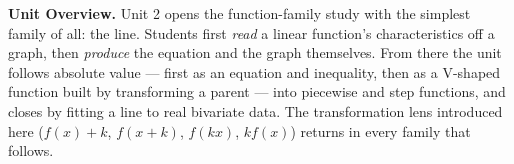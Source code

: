 \documentclass[10pt]{article}
\begin{document}

\vspace*{1.38in}

\begin{tcolorbox}[colback=forestbg,colframe=forest,boxrule=0.9pt,arc=2mm,
    left=4mm,right=4mm,top=3mm,bottom=3mm]
  \textbf{Unit Overview.}\quad
  Unit 2 opens the function-family study with the simplest family of all: the line.
  Students first \emph{read} a linear function's characteristics off a graph, then
  \emph{produce} the equation and the graph themselves. From there the unit follows
  absolute value --- first as an equation and inequality, then as a V-shaped function
  built by transforming a parent --- into piecewise and step functions, and closes by
  fitting a line to real bivariate data. The transformation lens introduced here
  ($f(x)+k$, $f(x+k)$, $f(kx)$, $kf(x)$) returns in every family that follows.
\end{tcolorbox}

\vspace{0.18in}
\end{document}
